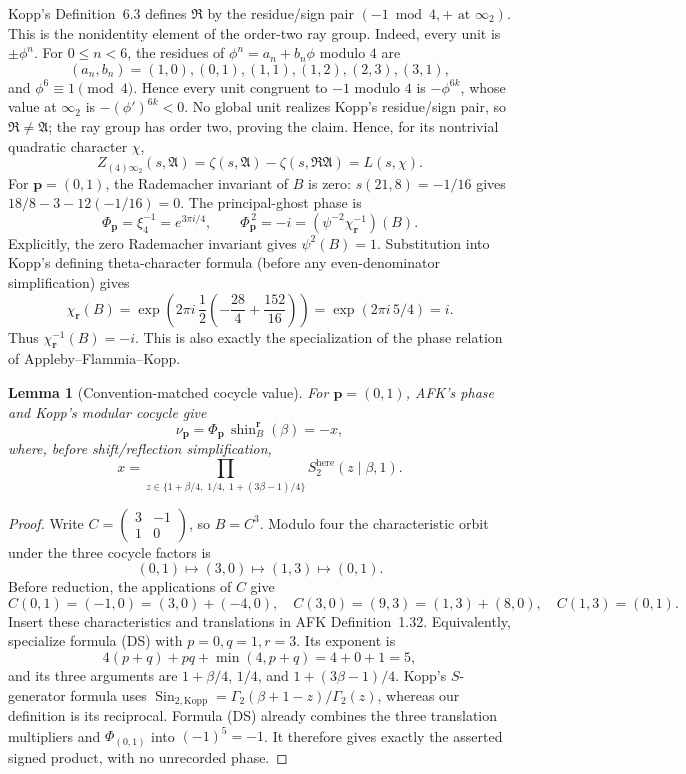 \documentclass[11pt]{article}
\newtheorem{lemma}[theorem]{Lemma}
\begin{document}
Kopp's Definition~6.3 defines $\mathfrak R$ by the residue/sign pair
$(-1\bmod4,+\text{ at }\infty_2)$.  This is the nonidentity element
of the order-two ray group.  Indeed, every unit is $\pm\phi^n$.  For
$0\le n<6$,
the residues of $\phi^n=a_n+b_n\phi$ modulo $4$ are
\[
(a_n,b_n)=(1,0),(0,1),(1,1),(1,2),(2,3),(3,1),
\]
and $\phi^6\equiv1\pmod4$.  Hence every unit congruent to $-1$ modulo
$4$ is $-\phi^{6k}$, whose value at $\infty_2$ is
$-(\phi')^{6k}<0$.  No global unit realizes Kopp's residue/sign pair,
so $\mathfrak R\ne\mathfrak A$; the ray group has order two, proving
the claim.
Hence, for its nontrivial quadratic character
$\chi$,
\[
 Z_{(4)\infty_2}(s,\mathfrak A)
 =\zeta(s,\mathfrak A)-\zeta(s,\mathfrak R\mathfrak A)
 =L(s,\chi).
\]
For $\boldsymbol p=(0,1)$, the Rademacher invariant of $B$ is zero:
$s(21,8)=-1/16$ gives
$18/8-3-12(-1/16)=0$.  The principal-ghost phase is
\[
 \Phi_{\boldsymbol p}
 =\xi_4^{-1}=e^{3\pi i/4},\qquad
 \Phi_{\boldsymbol p}^{\,2}=-i
 =(\psi^{-2}\chi_{\boldsymbol r}^{-1})(B).
\]
Explicitly, the zero Rademacher invariant gives $\psi^2(B)=1$.
Substitution into Kopp's defining theta-character formula (before any
even-denominator simplification) gives
\[
\chi_{\boldsymbol r}(B)
=\exp\!\left(2\pi i\,
\frac12\left(-\frac{28}{4}+\frac{152}{16}\right)\right)
=\exp(2\pi i\,5/4)=i.
\]
Thus $\chi_{\boldsymbol r}^{-1}(B)=-i$.  This is also exactly the
specialization of the phase relation of Appleby--Flammia--Kopp.

\begin{lemma}[Convention-matched cocycle value]\label{lem:cocycle}
For $\boldsymbol p=(0,1)$, AFK's phase and Kopp's modular cocycle give
\[
\nu_{\boldsymbol p}
=\Phi_{\boldsymbol p}\,
 \operatorname{shin}^{\boldsymbol r}_{B}(\beta)=-x,
\]
where, before shift/reflection simplification,
\[
x=\prod_{z\in\{1+\beta/4,\;1/4,\;1+(3\beta-1)/4\}}
 S_2^{\mathrm{here}}(z\mid\beta,1).
\]
\end{lemma}

\begin{proof}
Write $C=\left(\begin{smallmatrix}3&-1\\1&0\end{smallmatrix}\right)$,
so $B=C^3$.  Modulo four the characteristic orbit under the three
cocycle factors is
\[
 (0,1)\longmapsto(3,0)\longmapsto(1,3)\longmapsto(0,1).
\]
Before reduction, the applications of $C$ give
\[
 C(0,1)=(-1,0)=(3,0)+(-4,0),\quad
 C(3,0)=(9,3)=(1,3)+(8,0),\quad
 C(1,3)=(0,1).
\]
Insert these characteristics and translations in AFK Definition~1.32.
Equivalently, specialize formula \textup{(DS)} with
$p=0,q=1,r=3$.  Its exponent is
\[
4(p+q)+pq+\min(4,p+q)=4+0+1=5,
\]
and its three arguments are
$1+\beta/4$, $1/4$, and $1+(3\beta-1)/4$.
Kopp's $S$-generator formula uses
$\operatorname{Sin}_{2,\mathrm{Kopp}}
=\Gamma_2(\beta+1-z)/\Gamma_2(z)$, whereas our definition is its
reciprocal.  Formula \textup{(DS)} already combines the three
translation multipliers and $\Phi_{(0,1)}$ into $(-1)^5=-1$.
It therefore gives exactly the asserted signed product, with no
unrecorded phase.
\end{proof}
\end{document}
